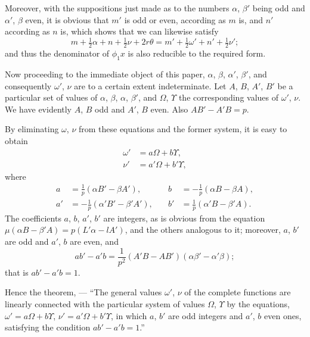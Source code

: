 \documentclass[12pt,a4paper]{article}
\begin{document}
\newpage
\setcounter{page}{133}

Moreover, with the suppositions just made as to the numbers $\alpha$, $\beta'$ being odd and $\alpha'$, $\beta$ even, it is obvious
that $m'$ is odd or even, according as $m$ is, and $n'$ according as $n$ is, which shows
that we can likewise satisfy
\[
m + \tfrac{1}{2}\alpha + n + \tfrac{1}{2}\nu + 2r\theta = m' + \tfrac{1}{2}\omega' + n' + \tfrac{1}{2}\nu';
\]
and thus the denominator of $\phi_1 x$ is also reducible to the required form.

Now proceeding to the immediate object of this paper, $\alpha$, $\beta$, $\alpha'$, $\beta'$, and consequently
$\omega'$, $\nu$ are to a certain extent indeterminate. Let $A$, $B$, $A'$, $B'$ be a particular set of
values of $\alpha$, $\beta$, $\alpha$, $\beta'$, and $\Omega$, $\Upsilon$ the corresponding values of $\omega'$, $\nu$. We have evidently
$A$, $B$ odd and $A'$, $B$ even. Also $AB' - A'B = p$.

\newpage
\setcounter{page}{134}

By eliminating $\omega$, $\nu$ from these equations and the former system, it is easy to obtain
\begin{align*}
\omega' &= a\Omega + b\Upsilon,\\
\nu' &= a'\Omega + b'\Upsilon,
\end{align*}
where
\begin{align*}
a &= \frac{1}{p}(\alpha B' - \beta A'),\quad &b &= -\frac{1}{p}(\alpha B - \beta A),\\
a' &= -\frac{1}{p}(\alpha' B' - \beta' A'),\quad &b' &= \frac{1}{p}(\alpha' B - \beta' A).
\end{align*}
The coefficients $a$, $b$, $a'$, $b'$ are integers, as is obvious from the equation $\mu(\alpha B - \beta' A)
= p(L'\alpha - lA')$, and the others analogous to it; moreover, $a$, $b'$ are odd and $a'$, $b$ are
even, and
\[
ab' - a'b = \frac{1}{p^2}(A'B - AB')(\alpha\beta' - \alpha'\beta);
\]
that is $ab' - a'b = 1$.

Hence the theorem, --- ``The general values $\omega'$, $\nu$ of the complete functions are
linearly connected with the particular system of values $\Omega$, $\Upsilon$ by the equations,
$\omega' = a\Omega + b\Upsilon$, $\nu' = a'\Omega + b'\Upsilon$, in which $a$, $b'$ are odd integers and $a'$, $b$ even ones,
satisfying the condition $ab' - a'b = 1$.''

\newpage
\setcounter{page}{135}
\end{document}
